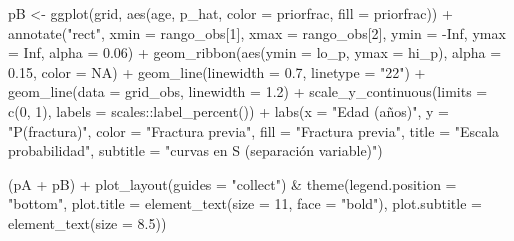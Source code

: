 \documentclass[
  letterpaper,
  DIV=11,
  numbers=noendperiod]{scrartcl}
\newenvironment{Shaded}{\begin{snugshade}}{\end{snugshade}}
\newcommand{\AttributeTok}[1]{\textcolor[rgb]{0.40,0.45,0.13}{#1}}
\newcommand{\ConstantTok}[1]{\textcolor[rgb]{0.56,0.35,0.01}{#1}}
\newcommand{\DecValTok}[1]{\textcolor[rgb]{0.68,0.00,0.00}{#1}}
\newcommand{\FloatTok}[1]{\textcolor[rgb]{0.68,0.00,0.00}{#1}}
\newcommand{\FunctionTok}[1]{\textcolor[rgb]{0.28,0.35,0.67}{#1}}
\newcommand{\NormalTok}[1]{\textcolor[rgb]{0.00,0.23,0.31}{#1}}
\newcommand{\OtherTok}[1]{\textcolor[rgb]{0.00,0.23,0.31}{#1}}
\newcommand{\SpecialCharTok}[1]{\textcolor[rgb]{0.37,0.37,0.37}{#1}}
\newcommand{\StringTok}[1]{\textcolor[rgb]{0.13,0.47,0.30}{#1}}
\begin{document}
\begin{Shaded}
\begin{Highlighting}[]
\NormalTok{pB }\OtherTok{\textless{}{-}} \FunctionTok{ggplot}\NormalTok{(grid, }\FunctionTok{aes}\NormalTok{(age, p\_hat, }\AttributeTok{color =}\NormalTok{ priorfrac, }\AttributeTok{fill =}\NormalTok{ priorfrac)) }\SpecialCharTok{+}
  \FunctionTok{annotate}\NormalTok{(}\StringTok{"rect"}\NormalTok{, }\AttributeTok{xmin =}\NormalTok{ rango\_obs[}\DecValTok{1}\NormalTok{], }\AttributeTok{xmax =}\NormalTok{ rango\_obs[}\DecValTok{2}\NormalTok{],}
           \AttributeTok{ymin =} \SpecialCharTok{{-}}\ConstantTok{Inf}\NormalTok{, }\AttributeTok{ymax =} \ConstantTok{Inf}\NormalTok{, }\AttributeTok{alpha =} \FloatTok{0.06}\NormalTok{) }\SpecialCharTok{+}
  \FunctionTok{geom\_ribbon}\NormalTok{(}\FunctionTok{aes}\NormalTok{(}\AttributeTok{ymin =}\NormalTok{ lo\_p, }\AttributeTok{ymax =}\NormalTok{ hi\_p), }\AttributeTok{alpha =} \FloatTok{0.15}\NormalTok{, }\AttributeTok{color =} \ConstantTok{NA}\NormalTok{) }\SpecialCharTok{+}
  \FunctionTok{geom\_line}\NormalTok{(}\AttributeTok{linewidth =} \FloatTok{0.7}\NormalTok{, }\AttributeTok{linetype =} \StringTok{"22"}\NormalTok{) }\SpecialCharTok{+}
  \FunctionTok{geom\_line}\NormalTok{(}\AttributeTok{data =}\NormalTok{ grid\_obs, }\AttributeTok{linewidth =} \FloatTok{1.2}\NormalTok{) }\SpecialCharTok{+}
  \FunctionTok{scale\_y\_continuous}\NormalTok{(}\AttributeTok{limits =} \FunctionTok{c}\NormalTok{(}\DecValTok{0}\NormalTok{, }\DecValTok{1}\NormalTok{), }\AttributeTok{labels =}\NormalTok{ scales}\SpecialCharTok{::}\FunctionTok{label\_percent}\NormalTok{()) }\SpecialCharTok{+}
  \FunctionTok{labs}\NormalTok{(}\AttributeTok{x =} \StringTok{"Edad (años)"}\NormalTok{, }\AttributeTok{y =} \StringTok{"P(fractura)"}\NormalTok{,}
       \AttributeTok{color =} \StringTok{"Fractura previa"}\NormalTok{, }\AttributeTok{fill =} \StringTok{"Fractura previa"}\NormalTok{,}
       \AttributeTok{title =} \StringTok{"Escala probabilidad"}\NormalTok{, }\AttributeTok{subtitle =} \StringTok{"curvas en S (separación variable)"}\NormalTok{)}

\NormalTok{(pA }\SpecialCharTok{+}\NormalTok{ pB) }\SpecialCharTok{+}
  \FunctionTok{plot\_layout}\NormalTok{(}\AttributeTok{guides =} \StringTok{"collect"}\NormalTok{) }\SpecialCharTok{\&}
  \FunctionTok{theme}\NormalTok{(}\AttributeTok{legend.position =} \StringTok{"bottom"}\NormalTok{,}
        \AttributeTok{plot.title    =} \FunctionTok{element\_text}\NormalTok{(}\AttributeTok{size =} \DecValTok{11}\NormalTok{, }\AttributeTok{face =} \StringTok{"bold"}\NormalTok{),}
        \AttributeTok{plot.subtitle =} \FunctionTok{element\_text}\NormalTok{(}\AttributeTok{size =} \FloatTok{8.5}\NormalTok{))}
\end{Highlighting}
\end{Shaded}
\end{document}
